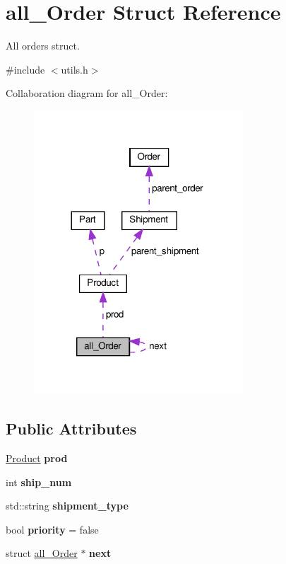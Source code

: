 \hypertarget{structall__Order}{}\section{all\+\_\+\+Order Struct Reference}
\label{structall__Order}


All orders struct.  




{\ttfamily \#include $<$utils.\+h$>$}



Collaboration diagram for all\+\_\+\+Order\+:
\nopagebreak
\begin{figure}[H]
\begin{center}
\leavevmode
\includegraphics[width=221pt]{structall__Order__coll__graph}
\end{center}
\end{figure}
\subsection*{Public Attributes}
\begin{DoxyCompactItemize}
\item 
\mbox{\label{structall__Order_abc229a6a4397223dda36c862d7a3b54c}} 
\hyperlink{structProduct}{Product} {\bfseries prod}
\item 
\mbox{\label{structall__Order_ad4b0a583424de97e7803edae8e163644}} 
int {\bfseries ship\+\_\+num}
\item 
\mbox{\label{structall__Order_a1f394679c4b09fab73b5e7b0284481a9}} 
std\+::string {\bfseries shipment\+\_\+type}
\item 
\mbox{\label{structall__Order_a75278cdaa72ad356e1408c77a7d17c1c}} 
bool {\bfseries priority} = false
\item 
\mbox{\label{structall__Order_a27427252ea752809669ea6cafd3f334d}} 
struct \hyperlink{structall__Order}{all\+\_\+\+Order} $\ast$ {\bfseries next}
\end{DoxyCompactItemize}


